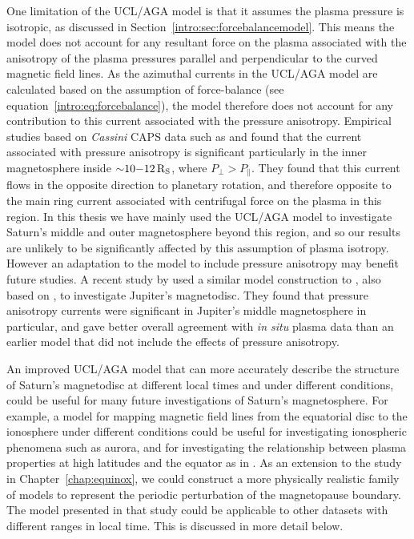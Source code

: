 One limitation of the UCL/AGA model is that it assumes the plasma pressure is isotropic, as discussed in Section~\ref{intro:sec:forcebalancemodel}. This means the model does not account for any resultant force on the plasma associated with the anisotropy of the plasma pressures parallel and perpendicular to the curved magnetic field lines. As the azimuthal currents in the UCL/AGA model are calculated based on the assumption of force-balance (see equation~\ref{intro:eq:forcebalance}), the model therefore does not account for any contribution to this current associated with the pressure anisotropy. Empirical studies based on \textit{Cassini} CAPS data such as \citet{sergis2010} and \citet{kellett2011} found that the current associated with pressure anisotropy is significant particularly in the inner magnetosphere inside ${\sim}10{\--}\SI{12}{R_S}$, where $P_\perp > P_\parallel$. They found that this current flows in the opposite direction to planetary rotation, and therefore opposite to the main ring current associated with centrifugal force on the plasma in this region. In this thesis we have mainly used the UCL/AGA model to investigate Saturn's middle and outer magnetosphere beyond this region, and so our results are unlikely to be significantly affected by this assumption of plasma isotropy. However an adaptation to the model to include pressure anisotropy may benefit future studies. A recent study by \citet{nichols2015} used a similar model construction to \citet{achilleos2010a}, also based on \citet{caudal1986}, to investigate Jupiter's magnetodisc. They found that pressure anisotropy currents were significant in Jupiter's middle magnetosphere in particular, and gave better overall agreement with \textit{in situ} plasma data than an earlier model \citep{nichols2011} that did not include the effects of pressure anisotropy.

An improved UCL/AGA model that can more accurately describe the structure of Saturn's magnetodisc at different local times and under different conditions, could be useful for many future investigations of Saturn's magnetosphere. For example, a model for mapping magnetic field lines from the equatorial disc to the ionosphere under different conditions could be useful for investigating ionospheric phenomena such as aurora, and for investigating the relationship between plasma properties at high latitudes and the equator as in \citet{sergis2018}. As an extension to the study in Chapter~\ref{chap:equinox}, we could construct a more physically realistic family of models to represent the periodic perturbation of the magnetopause boundary. The model presented in that study could be applicable to other datasets with different ranges in local time. This is discussed in more detail below.

